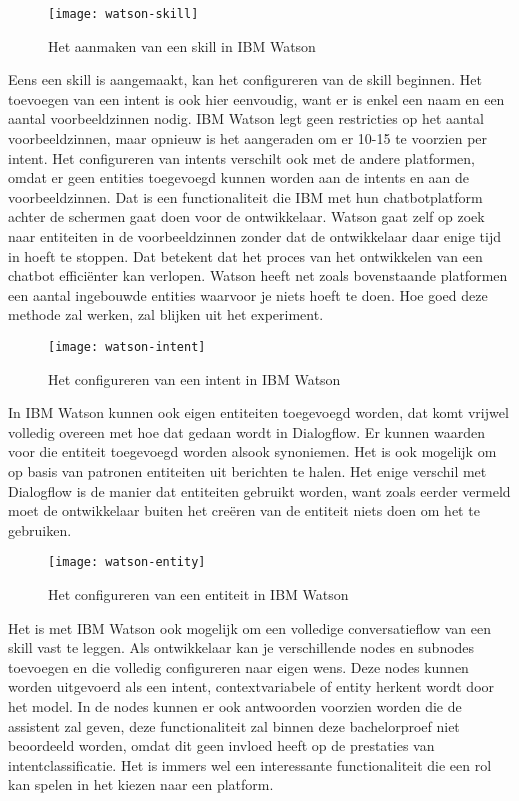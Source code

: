\begin{figure}[H]
    \label{fig:watson-skill}
    \centering
    \texttt{[image: watson-skill]}
    \caption{Het aanmaken van een skill in IBM Watson}
\end{figure}

Eens een skill is aangemaakt, kan het configureren van de skill beginnen. Het toevoegen van een intent is ook hier eenvoudig, want er is enkel een naam en een aantal voorbeeldzinnen nodig. IBM Watson legt geen restricties op het aantal voorbeeldzinnen, maar opnieuw is het aangeraden om er 10-15 te voorzien per intent. Het configureren van intents verschilt ook met de andere platformen, omdat er geen entities toegevoegd kunnen worden aan de intents en aan de voorbeeldzinnen. Dat is een functionaliteit die IBM met hun chatbotplatform achter de schermen gaat doen voor de ontwikkelaar. Watson gaat zelf op zoek naar entiteiten in de voorbeeldzinnen zonder dat de ontwikkelaar daar enige tijd in hoeft te stoppen. Dat betekent dat het proces van het ontwikkelen van een chatbot efficiënter kan verlopen. Watson heeft net zoals bovenstaande platformen een aantal ingebouwde entities waarvoor je niets hoeft te doen. Hoe goed deze methode zal werken, zal blijken uit het experiment.

\begin{figure}[H]
    \label{fig:watson-intent}
    \centering
    \texttt{[image: watson-intent]}
    \caption{Het configureren van een intent in IBM Watson}
\end{figure}

In IBM Watson kunnen ook eigen entiteiten toegevoegd worden, dat komt vrijwel volledig overeen met hoe dat gedaan wordt in Dialogflow. Er kunnen waarden voor die entiteit toegevoegd worden alsook synoniemen. Het is ook mogelijk om op basis van patronen entiteiten uit berichten te halen. Het enige verschil met Dialogflow is de manier dat entiteiten gebruikt worden, want zoals eerder vermeld moet de ontwikkelaar buiten het creëren van de entiteit niets doen om het te gebruiken.

\begin{figure}[H]
    \label{fig:watson-entity}
    \centering
    \texttt{[image: watson-entity]}
    \caption{Het configureren van een entiteit in IBM Watson}
\end{figure}

Het is met IBM Watson ook mogelijk om een volledige conversatieflow van een skill vast te leggen. Als ontwikkelaar kan je verschillende nodes en subnodes toevoegen en die volledig configureren naar eigen wens. Deze nodes kunnen worden uitgevoerd als een intent, contextvariabele of entity herkent wordt door het model. In de nodes kunnen er ook antwoorden voorzien worden die de assistent zal geven, deze functionaliteit zal binnen deze bachelorproef niet beoordeeld worden, omdat dit geen invloed heeft op de prestaties van intentclassificatie. Het is immers wel een interessante functionaliteit die een rol kan spelen in het kiezen naar een platform.

